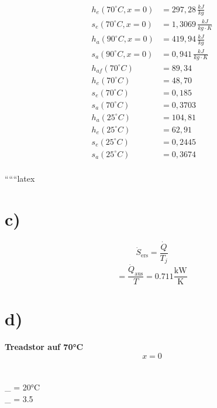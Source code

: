 \begin{align*}
h_e (70^\circ C, x=0) &= 297,28 \, \frac{kJ}{kg} \\
s_e (70^\circ C, x=0) &= 1,3069 \, \frac{kJ}{kg \cdot K} \\
h_a (90^\circ C, x=0) &= 419,94 \, \frac{kJ}{kg} \\
s_a (90^\circ C, x=0) &= 0,941 \, \frac{kJ}{kg \cdot K} \\
h_{af} (70^\circ C) &= 89,34 \\
h_e (70^\circ C) &= 48,70 \\
s_e (70^\circ C) &= 0,185 \\
s_a (70^\circ C) &= 0,3703 \\
h_a (25^\circ C) &= 104,81 \\
h_e (25^\circ C) &= 62,91 \\
s_e (25^\circ C) &= 0,2445 \\
s_a (25^\circ C) &= 0,3674 \\
\end{align*}

``````latex


\section*{c)}
\begin{equation*}
    \dot{S}_{\text{ers}} = \frac{\dot{Q}}{T_j}
\end{equation*}
\begin{equation*}
    = \frac{\dot{Q}_{\text{aus}}}{T} = 0.711 \frac{\text{kW}}{\text{K}}
\end{equation*}

\section*{d)}
\textbf{Treadstor auf 70°C} \\
\begin{equation*}
    x = 0
\end{equation*}
 \\
 \\
_{} = 20°C \\
_{} = 3.5  \\


